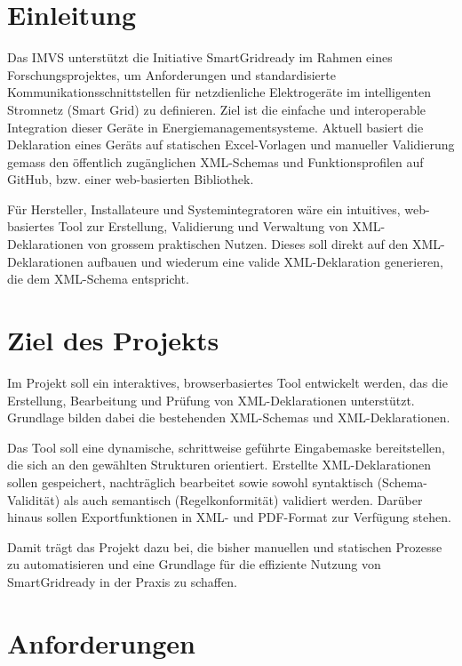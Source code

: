\documentclass[a4paper,12pt]{article}
\begin{document}
\newpage

\section{Einleitung}
Das IMVS unterstützt die Initiative SmartGridready im Rahmen eines Forschungsprojektes, um Anforderungen und standardisierte Kommunikationsschnittstellen für netzdienliche Elektrogeräte im intelligenten Stromnetz (Smart Grid) zu definieren. Ziel ist die einfache und interoperable Integration dieser Geräte in Energiemanagementsysteme. Aktuell basiert die Deklaration eines Geräts auf statischen Excel-Vorlagen und manueller Validierung gemass den öffentlich zugänglichen XML-Schemas und Funktionsprofilen auf GitHub, bzw. einer web-basierten Bibliothek.

Für Hersteller, Installateure und Systemintegratoren wäre ein intuitives, web-basiertes Tool zur Erstellung, Validierung und Verwaltung von XML-Deklarationen von grossem praktischen Nutzen. Dieses soll direkt auf den XML-Deklarationen aufbauen und wiederum eine valide XML-Deklaration generieren, die dem XML-Schema entspricht.


\section{Ziel des Projekts}
Im Projekt soll ein interaktives, browserbasiertes Tool entwickelt werden, das die Erstellung, Bearbeitung und Prüfung von XML-Deklarationen unterstützt. Grundlage bilden dabei die bestehenden XML-Schemas und XML-Deklarationen.

Das Tool soll eine dynamische, schrittweise geführte Eingabemaske bereitstellen, die sich an den gewählten Strukturen orientiert. Erstellte XML-Deklarationen sollen gespeichert, nachträglich bearbeitet sowie sowohl syntaktisch (Schema-Validität) als auch semantisch (Regelkonformität) validiert werden. Darüber hinaus sollen Exportfunktionen in XML- und PDF-Format zur Verfügung stehen.

Damit trägt das Projekt dazu bei, die bisher manuellen und statischen Prozesse zu automatisieren und eine Grundlage für die effiziente Nutzung von SmartGridready in der Praxis zu schaffen.

\newpage

\section{Anforderungen}
\end{document}
